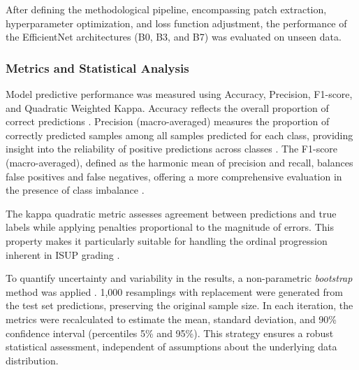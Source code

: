 After defining the methodological pipeline, encompassing patch extraction, hyperparameter optimization, and loss function adjustment, the performance of the EfficientNet architectures (B0, B3, and B7) was evaluated on unseen data.

\subsubsection{Metrics and Statistical Analysis}

Model predictive performance was measured using Accuracy, Precision, F1-score, and Quadratic Weighted Kappa.  
Accuracy reflects the overall proportion of correct predictions \cite{baldi2000assessing}. Precision (macro-averaged) measures the proportion of correctly predicted samples among all samples predicted for each class, providing insight into the reliability of positive predictions across classes \cite{sokolova2009systematic}.  
The F1-score (macro-averaged), defined as the harmonic mean of precision and recall, balances false positives and false negatives, offering a more comprehensive evaluation in the presence of class imbalance \cite{powers2011evaluation}.

The kappa quadratic metric assesses agreement between predictions and true labels while applying penalties proportional to the magnitude of errors.  
This property makes it particularly suitable for handling the ordinal progression inherent in ISUP grading \cite{ref-cohen1968}.

To quantify uncertainty and variability in the results, a non-parametric \textit{bootstrap} method was applied \cite{efron1979bootstrap}.  
1,000 resamplings with replacement were generated from the test set predictions, preserving the original sample size.  
In each iteration, the metrics were recalculated to estimate the mean, standard deviation, and 90\% confidence interval (percentiles 5\% and 95\%).  
This strategy ensures a robust statistical assessment, independent of assumptions about the underlying data distribution.
